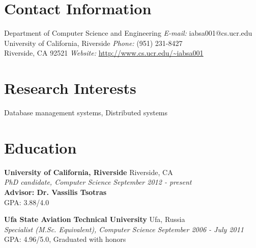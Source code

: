 \documentclass[margin,line]{res}
\begin{document}

\begin{resume}
\section{\sc Contact Information}
Department of Computer Science and Engineering \hfill	{\it E-mail:}  iabsa001@cs.ucr.edu\\      
University of California, Riverside \hfill 				{\it Phone:}    (951) 231-8427 \\
Riverside, CA 92521	\hfill								{\it Website:} \url{http://www.cs.ucr.edu/~iabsa001} \\


\section{\sc Research Interests}
Database management systems, Distributed systems

\section{\sc Education}
{\bf University of California, Riverside} \hfill {Riverside, CA}\\
{\em PhD candidate, Computer Science} \hfill {\it September 2012 - present}\\
{\bf Advisor: Dr. Vassilis Tsotras} \\
{GPA: 3.88/4.0}

{\bf Ufa State Aviation Technical University} \hfill { Ufa, Russia }\\
{\em Specialist (M.Sc. Equivalent), Computer Science} \hfill {\it September 2006 - July 2011}\\
{GPA: 4.96/5.0, Graduated with honors}


\end{resume}
\end{document}
